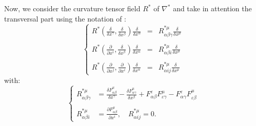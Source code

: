 \documentclass[11pt,oneside,english]{amsart}
\numberwithin{equation}{section}
\numberwithin{figure}{section}
\theoremstyle{plain}
\theoremstyle{definition}
\theoremstyle{definition}
\theoremstyle{plain}
\theoremstyle{plain}
\theoremstyle{remark}
\theoremstyle{remark}
\begin{document}
\medskip{}

Now, we consider the curvature tensor field $R^{*}$ of $\nabla^{*}$
and take in attention the transversal part using the notation of \cite[p. 104]{b:f08}:
\begin{equation}
\left\{ \begin{array}{llll}
R^{*}\left(\frac{\delta}{\delta x^{\gamma}},\frac{\delta}{\delta x^{\beta}}\right)\frac{\delta}{\delta x^{\alpha}} & = & R_{\alpha\beta\gamma}^{*\mu}\frac{\delta}{\delta x^{\mu}}\\
\\R^{*}\left(\frac{\partial}{\partial x^{i}},\frac{\delta}{\delta x^{\beta}}\right)\frac{\delta}{\delta x^{\alpha}} & = & R_{\alpha\beta i}^{*\mu}\frac{\delta}{\delta x^{\mu}}\\
\\R^{*}\left(\frac{\partial}{\partial x^{j}},\frac{\partial}{\partial x^{i}}\right)\frac{\delta}{\delta x^{\alpha}} & = & R_{\alpha ij}^{*\mu}\frac{\delta}{\delta x^{\mu}}\end{array}\right.\label{eq:24}\end{equation}
 with: \begin{equation}
\left\{ \begin{array}{ll}
R_{\alpha\beta\gamma}^{*\mu} & =\frac{\delta F_{\alpha\beta}^{\mu}}{\delta x^{\gamma}}-\frac{\delta F_{\alpha\gamma}^{\mu}}{\delta x^{\beta}}+F_{\alpha\beta}^{\varepsilon}F_{\varepsilon\gamma}^{\mu}-F_{\alpha\gamma}^{\varepsilon}F_{\varepsilon\beta}^{\mu}\\
\\R_{\alpha\beta i}^{*\mu} & =\frac{\partial F_{\alpha\beta}^{\mu}}{\partial x^{i}},\quad R_{\alpha ij}^{*\mu}=0.\end{array}\right.\label{eq:25}\end{equation}
\end{document}
